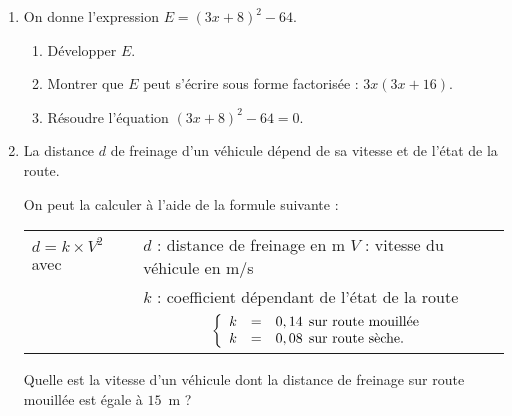 \begin{enumerate}

\item  On donne l'expression $E = (3x + 8)^2 - 64$.
	\begin{enumerate}
		\item Développer $E$.
		\item  Montrer que $E$ peut s'écrire sous forme factorisée : $3x(3x + 16)$.
		\item  Résoudre l'équation $(3x + 8)^2 - 64 = 0$.
	\end{enumerate}
\item  La distance $d$ de freinage d'un véhicule dépend de sa vitesse et de l'état de la route.
	
On peut la calculer à l'aide de la formule suivante :
	
\begin{tabularx}{\linewidth}{m{2.3cm} X}
$d = k \times  V^2$ avec 	&$d$ : distance de freinage en m \: $V$ : vitesse du véhicule en m/s\\
							&$k$ : coefficient dépendant de l'état de la route\\
							&\multicolumn{1}{c}{$\left\{\begin{array}{l c l}
k &=& 0,14 \:\:\text{sur route mouillée}\\
k &=& 0,08 \:\:\text{sur route sèche.}
\end{array}\right.$}\\
\end{tabularx}

Quelle est la vitesse d'un véhicule dont la distance de freinage sur route mouillée est égale à $15$~m ?
\end{enumerate}

